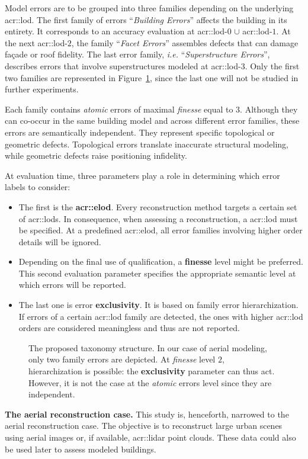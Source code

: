 \documentclass[runningheads]{llncs}
\begin{document}
Model errors are to be grouped into three families depending on the underlying \acrshort{acr::lod}. The first family of errors ``\textit{Building Errors}'' affects the building in its entirety. It corresponds to an accuracy evaluation at \acrshort{acr::lod}-$0$ $\cup$ \acrshort{acr::lod}-$1$. At the next \acrshort{acr::lod}-$2$, the family ``\textit{Facet Errors}'' assembles defects that can damage fa\c{c}ade or roof fidelity. The last error family, \textit{i.e.} ``\textit{Superstructure Errors}'', describes errors that involve superstructures modeled at \acrshort{acr::lod}-$3$. Only the first two families are represented in Figure~\ref{fig::taxonomy}, since the last one will not be studied in further experiments.

Each family contains \textit{atomic} errors of maximal \textit{finesse} equal to $3$. Although they can co-occur in the same building model and across different error families, these errors are semantically independent. They represent specific topological or geometric defects. Topological errors translate inaccurate structural modeling, while geometric defects raise positioning infidelity.

At evaluation time, three parameters play a role in determining which error labels to consider:
\begin{itemize}
    \item The first is the \textbf{\acrfull{acr::elod}}. Every reconstruction method targets a certain set of \glspl{acr::lod}. In consequence, when assessing a reconstruction, a \acrshort{acr::lod} must be specified. At a predefined \acrshort{acr::elod}, all error families involving higher order details will be ignored.
    \item Depending on the final use of qualification, a \textbf{finesse} level might be preferred. This second evaluation parameter specifies the appropriate semantic level at which errors will be reported.
    \item The last one is error \textbf{exclusivity}. It is based on family error hierarchization. If errors of a certain \acrshort{acr::lod} family are detected, the ones with higher \acrshort{acr::lod} orders are considered meaningless and thus are not reported.
\end{itemize}

	\begin{figure}
        \begin{center}
            
            \caption{\label{fig::taxonomy} The proposed taxonomy structure. In our case of aerial modeling, only two family errors are depicted. At \textit{finesse} level $2$, hierarchization is possible: the \textbf{exclusivity} parameter can thus act. However, it is not the case at the \textit{atomic} errors level since they are independent. }
        \end{center}
    \end{figure}
\noindent
\textbf{The aerial reconstruction case.}
This study is, henceforth, narrowed to the aerial reconstruction case. The objective is to reconstruct large urban scenes using aerial images or, if available, \acrshort{acr::lidar} point clouds. These data could also be used later to assess modeled buildings.
\end{document}
